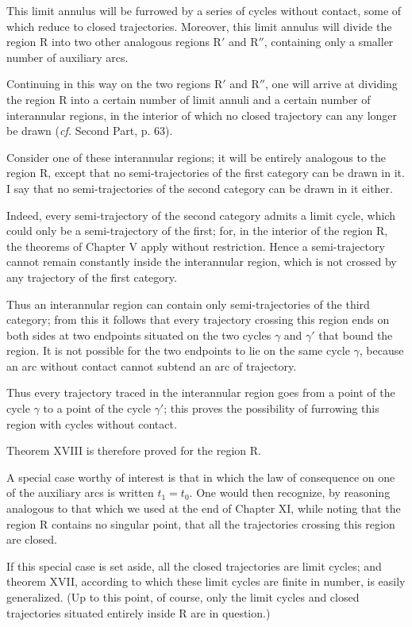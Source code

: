 \documentclass[11pt]{article}
\begin{document}
This limit annulus will be furrowed by a series of cycles without contact, some of which reduce to closed trajectories. Moreover, this limit annulus will divide the region R into two other analogous regions R$'$ and R$''$, containing only a smaller number of auxiliary arcs.

Continuing in this way on the two regions R$'$ and R$''$, one will arrive at dividing the region R into a certain number of limit annuli and a certain number of interannular regions, in the interior of which no closed trajectory can any longer be drawn (\emph{cf.} Second Part, p. 63).

Consider one of these interannular regions; it will be entirely analogous to the region R, except that no semi-trajectories of the first category can be drawn in it. I say that no semi-trajectories of the second category can be drawn in it either.

Indeed, every semi-trajectory of the second category admits a limit cycle, which could only be a semi-trajectory of the first; for, in the interior of the region R, the theorems of Chapter V apply without restriction. Hence a semi-trajectory cannot remain constantly inside the interannular region, which is not crossed by any trajectory of the first category.

Thus an interannular region can contain only semi-trajectories of the third category; from this it follows that every trajectory crossing this region ends on both sides at two endpoints situated on the two cycles $\gamma$ and $\gamma'$ that bound the region. It is not possible for the two endpoints to lie on the same cycle $\gamma$, because an arc without contact cannot subtend an arc of trajectory.

Thus every trajectory traced in the interannular region goes from a point of the cycle $\gamma$ to a point of the cycle $\gamma'$; this proves the possibility of furrowing this region with cycles without contact.

Theorem XVIII is therefore proved for the region R.

A special case worthy of interest is that in which the law of consequence on one of the auxiliary arcs is written $t_1=t_0$. One would then recognize, by reasoning analogous to that which we used at the end of Chapter XI, while noting that the region R contains no singular point, that all the trajectories crossing this region are closed.

If this special case is set aside, all the closed trajectories are limit cycles; and theorem XVII, according to which these limit cycles are finite in number, is easily generalized. (Up to this point, of course, only the limit cycles and closed trajectories situated entirely inside R are in question.)
\end{document}
